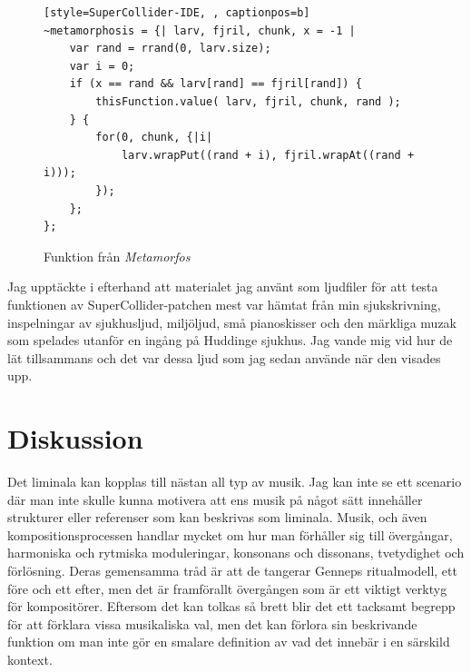 \documentclass{article}
\renewcommand{\baselinestretch}{1.5}
\begin{document}
\begin{figure}[hb]
\renewcommand{\baselinestretch}{1}
\begin{lstlisting}[style=SuperCollider-IDE, , captionpos=b]
~metamorphosis = {| larv, fjril, chunk, x = -1 |
	var rand = rrand(0, larv.size);
	var i = 0;
	if (x == rand && larv[rand] == fjril[rand]) {
		thisFunction.value( larv, fjril, chunk, rand );
	} {
		for(0, chunk, {|i|
			larv.wrapPut((rand + i), fjril.wrapAt((rand + i)));
		});
	};
};
\end{lstlisting}
\caption{Funktion från \emph{Metamorfos}}
\end{figure}
\renewcommand{\baselinestretch}{1.5}
\pagebreak

Jag upptäckte i efterhand att materialet jag använt som ljudfiler för att testa funktionen av
SuperCollider-patchen mest var hämtat från min sjukskrivning, inspelningar av sjukhusljud, miljöljud, små
pianoskisser och den märkliga muzak som spelades utanför en ingång på Huddinge sjukhus. Jag vande mig vid hur
de lät tillsammans och det var dessa ljud som jag sedan använde när den visades upp. 
%



\pagebreak
\section{Diskussion}
Det liminala kan kopplas till nästan all typ av musik. Jag kan inte se ett scenario där man inte skulle kunna
motivera att ens musik på något sätt innehåller strukturer eller referenser som kan beskrivas som liminala.
Musik, och även kompositionsprocessen handlar mycket om hur man förhåller sig till övergångar, harmoniska och
rytmiska moduleringar, konsonans och dissonans, tvetydighet och förlösning. Deras gemensamma tråd är att de
tangerar Genneps ritualmodell, ett före och ett efter, men det är framförallt övergången som är ett viktigt
verktyg för kompositörer. Eftersom det kan tolkas så brett blir det ett tacksamt begrepp för att förklara
vissa musikaliska val, men det kan förlora sin beskrivande funktion om man inte gör en smalare definition av
vad det innebär i en särskild kontext.
\end{document}
